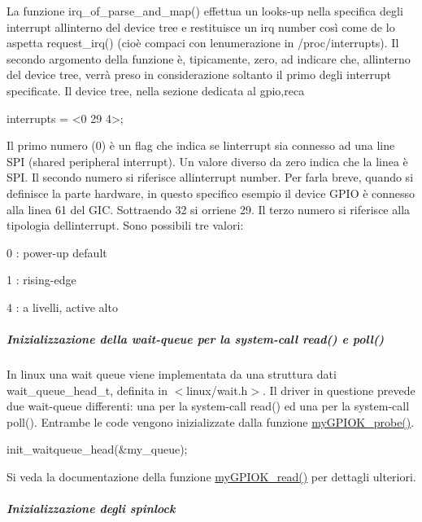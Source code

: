 La funzione irq\+\_\+of\+\_\+parse\+\_\+and\+\_\+map() effettua un looks-\/up nella specifica degli interrupt all\textquotesingle{}interno del device tree e restituisce un irq number così come de lo aspetta request\+\_\+irq() (cioè compaci con l\textquotesingle{}enumerazione in /proc/interrupts). Il secondo argomento della funzione è, tipicamente, zero, ad indicare che, all\textquotesingle{}interno del device tree, verrà preso in considerazione soltanto il primo degli interrupt specificate. Il device tree, nella sezione dedicata al gpio,reca 
\begin{DoxyCode}
interrupts = <0 29 4>;
\end{DoxyCode}
 Il primo numero (0) è un flag che indica se l\textquotesingle{}interrupt sia connesso ad una line S\+PI (shared peripheral interrupt). Un valore diverso da zero indica che la linea è S\+PI. Il secondo numero si riferisce all\textquotesingle{}interrupt number. Per farla breve, quando si definisce la parte hardware, in questo specifico esempio il device G\+P\+IO è connesso alla linea 61 del G\+IC. Sottraendo 32 si orriene 29. Il terzo numero si riferisce alla tipologia dell\textquotesingle{}interrupt. Sono possibili tre valori\+:
\begin{DoxyItemize}
\item 0 \+: power-\/up default
\item 1 \+: rising-\/edge
\item 4 \+: a livelli, active alto
\end{DoxyItemize}

\subparagraph*{Inizializzazione della wait-\/queue per la system-\/call read() e poll()}

In linux una wait queue viene implementata da una struttura dati wait\+\_\+queue\+\_\+head\+\_\+t, definita in $<$linux/wait.\+h$>$. Il driver in questione prevede due wait-\/queue differenti\+: una per la system-\/call read() ed una per la system-\/call poll(). Entrambe le code vengono inizializzate dalla funzione \hyperlink{group___linux-_driver_gae40973a06d72f7c41a9af07513a62307}{my\+G\+P\+I\+O\+K\+\_\+probe()}. 
\begin{DoxyCode}
init\_waitqueue\_head(&my\_queue);
\end{DoxyCode}
 Si veda la documentazione della funzione \hyperlink{group___linux-_driver_ga90ac339df9c02ae5f11a2a7727adc923}{my\+G\+P\+I\+O\+K\+\_\+read()} per dettagli ulteriori.

\subparagraph*{Inizializzazione degli spinlock}

